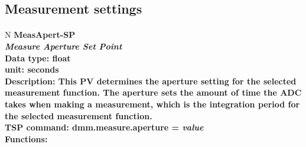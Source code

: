 \documentclass[openany]{article}
\begin{document}
	\subsection{Measurement settings}\label{pvgroup:meas-settings}

		\paragraph{} %

		\begin{tabular}{N}
			\hline
			\bfseries MeasApert-SP\label{pv:measapert-sp} \\ \hline
			\emph{Measure Aperture Set Point} \\
			Data type: float \\
			unit: seconds \\
			Description: This PV determines the aperture setting for the selected measurement function. The aperture sets the amount of time the ADC takes when making a measurement, which is the integration period for the selected measurement function. \\
			TSP command: dmm.measure.aperture = \emph{value} \\
			Functions: \\
			\arrayrulecolor{\FuncTableBorderColor}

		\end{tabular}
\end{document}
